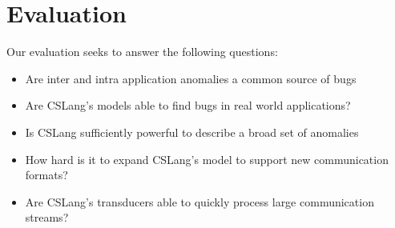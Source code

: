 \section{Evaluation}
\label{SEC:evaluation}

Our evaluation seeks to answer the following questions:

\begin{itemize}

  \item{Are inter and intra application anomalies a common source of
    bugs}

  \item{Are CSLang's models able to find bugs in real world applications?}

  \item{Is CSLang sufficiently powerful to describe a broad set of
    anomalies}

  \item{How hard is it to expand CSLang's model to support new
    communication formats?}

  \item{Are CSLang's transducers able to quickly process large
    communication streams?}

\end{itemize}
